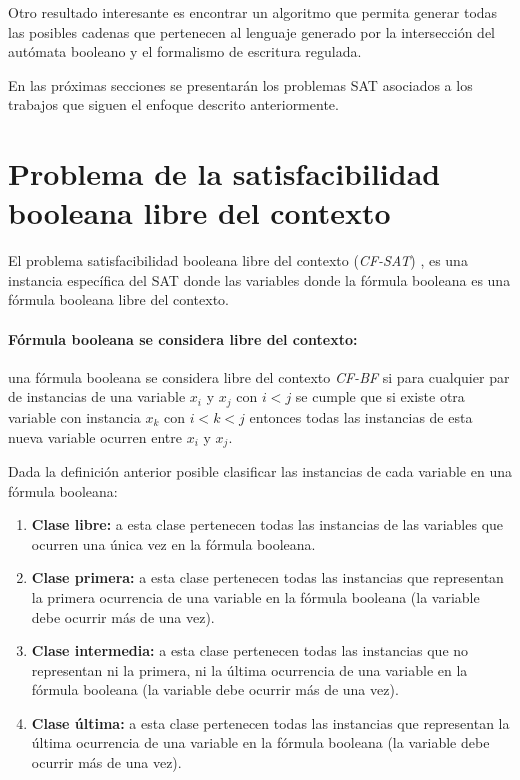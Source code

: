 Otro resultado interesante es encontrar un algoritmo que permita generar todas las posibles cadenas que pertenecen al lenguaje
generado por la intersección del autómata booleano y el formalismo de escritura regulada.

En las próximas secciones se presentarán los problemas SAT asociados a los trabajos que siguen el enfoque descrito anteriormente.

\section{Problema de la satisfacibilidad booleana libre del contexto}

El problema satisfacibilidad booleana libre del contexto (\textit{CF-SAT}) \cite{aCFSAT}, es una instancia específica
del SAT donde las variables donde la fórmula booleana es una fórmula booleana libre del contexto.

\paragraph{Fórmula booleana se considera libre del contexto:} una fórmula booleana se considera libre del contexto
\textit{CF-BF} si para cualquier par de instancias de una variable $x_i$ y $x_j$ con $i<j$ se
cumple que si existe otra variable con instancia $x_k$ con $i<k<j$ entonces todas las instancias de esta nueva
variable ocurren entre $x_i$ y $x_j$.

Dada la definición anterior posible clasificar las instancias de cada variable en una fórmula booleana:

\begin{enumerate}
      \item \textbf{Clase libre:} a esta clase pertenecen todas las instancias de las variables que ocurren
            una única vez en la fórmula booleana.
      \item \textbf{Clase primera:} a esta clase pertenecen todas las instancias que representan la primera
            ocurrencia de una variable en la fórmula booleana (la variable debe ocurrir más de una vez).
      \item \textbf{Clase intermedia:} a esta clase pertenecen todas las instancias que no representan ni la primera, ni la última
            ocurrencia de una variable en la fórmula booleana (la variable debe ocurrir más de una vez).
      \item \textbf{Clase última:} a esta clase pertenecen todas las instancias que representan la última
            ocurrencia de una variable en la fórmula booleana (la variable debe ocurrir más de una vez).
\end{enumerate}

